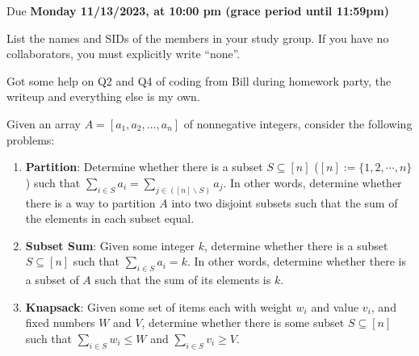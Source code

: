 \documentclass[11pt]{article}
\def\duedate{Monday 11/13/2023, at 10:00 pm (grace period until 11:59pm)}
\begin{document}
\maketitle


Due \textbf{\duedate}

List the names and SIDs of the members in your study group.
If you have no collaborators, you must explicitly write ``none''.

\begin{solution}
	Got some help on Q2 and Q4 of coding from Bill during homework party, the writeup and everything else 
	is my own. 
\end{solution}

Given an array $A=[a_1, a_2, \hdots, a_n]$ of nonnegative integers, consider the following problems:
\begin{enumerate}[1]
\item \textbf{Partition}: Determine whether there is a subset $S \subseteq [n]$ ($[n] := \{1,2, \cdots, n\}$) such that $\sum_{i\in S}a_i=\sum_{j\in ([n] \backslash S)}a_j$. In other words, determine whether there is a way to partition $A$ into two disjoint subsets such that the sum of the elements in each subset equal.
\item \textbf{Subset Sum}: Given some integer $k$, determine whether there is a subset $S \subseteq [n]$ such that $\sum_{i\in S}a_i=k$. In other words, determine whether there is a subset of $A$ such that the sum of its elements is $k$.
\item \textbf{Knapsack}: Given some set of items each with weight
$w_i$ and value $v_i$, and fixed numbers $W$ and $V$, determine
whether there is some subset $S\subseteq [n]$ such that $\sum_{i\in S}w_i \leq W$ and $\sum_{i\in S}v_i \geq V$.
\end{enumerate}
\end{document}
